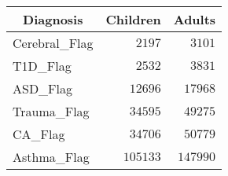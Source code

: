 \begin{table}[!tbp]
\begin{center}
\begin{tabular}{lrr}
\hline\hline
\multicolumn{1}{c}{Diagnosis}&\multicolumn{1}{c}{Children}&\multicolumn{1}{c}{Adults}\tabularnewline
\hline
Cerebral_Flag&$  2197$&$  3101$\tabularnewline
T1D_Flag&$  2532$&$  3831$\tabularnewline
ASD_Flag&$ 12696$&$ 17968$\tabularnewline
Trauma_Flag&$ 34595$&$ 49275$\tabularnewline
CA_Flag&$ 34706$&$ 50779$\tabularnewline
Asthma_Flag&$105133$&$147990$\tabularnewline
\hline
\end{tabular}\end{center}
\end{table}
